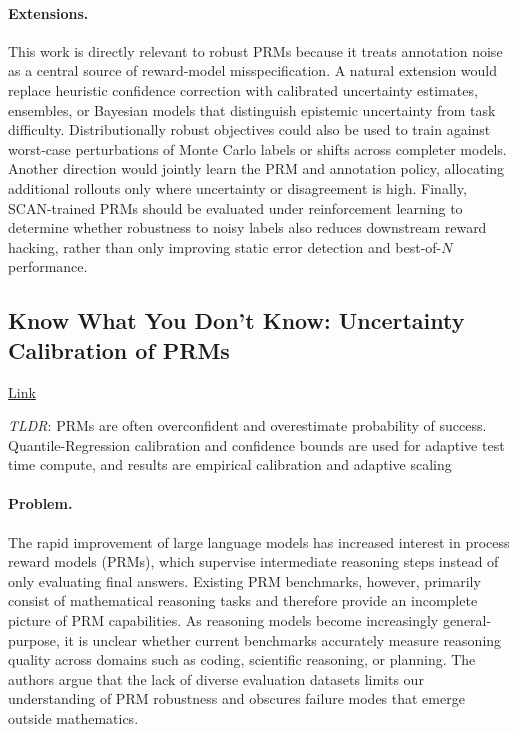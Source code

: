 \documentclass[11pt]{article}
\begin{document}
\paragraph{Extensions.}
This work is directly relevant to robust PRMs because it treats annotation noise as a central source of reward-model misspecification. A natural extension would replace heuristic confidence correction with calibrated uncertainty estimates, ensembles, or Bayesian models that distinguish epistemic uncertainty from task difficulty. Distributionally robust objectives could also be used to train against worst-case perturbations of Monte Carlo labels or shifts across completer models. Another direction would jointly learn the PRM and annotation policy, allocating additional rollouts only where uncertainty or disagreement is high. Finally, SCAN-trained PRMs should be evaluated under reinforcement learning to determine whether robustness to noisy labels also reduces downstream reward hacking, rather than only improving static error detection and best-of-$N$ performance.

\subsection{Know What You Don't Know: Uncertainty Calibration of PRMs}

\href{https://arxiv.org/abs/2506.09338}{Link}

\emph{TLDR}: PRMs are often overconfident and overestimate probability of success. Quantile-Regression calibration and confidence bounds are used for adaptive test time compute, and results are empirical calibration and adaptive scaling

\paragraph{Problem.}
The rapid improvement of large language models has increased interest in process reward models (PRMs), which supervise intermediate reasoning steps instead of only evaluating final answers. Existing PRM benchmarks, however, primarily consist of mathematical reasoning tasks and therefore provide an incomplete picture of PRM capabilities. As reasoning models become increasingly general-purpose, it is unclear whether current benchmarks accurately measure reasoning quality across domains such as coding, scientific reasoning, or planning. The authors argue that the lack of diverse evaluation datasets limits our understanding of PRM robustness and obscures failure modes that emerge outside mathematics.
\end{document}
